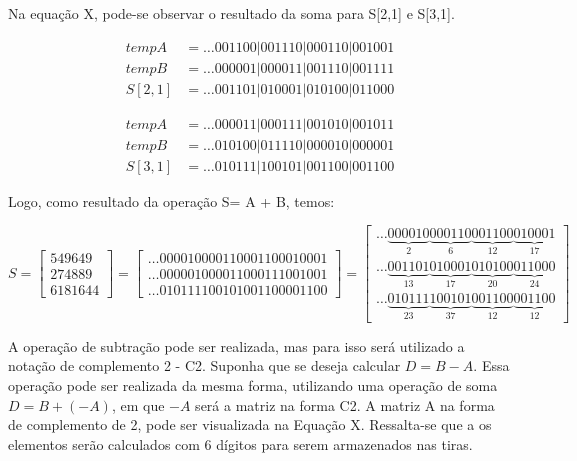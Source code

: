 \documentclass[12pt]{article}
\begin{document}
Na equação X, pode-se observar o resultado da soma para S[2,1] e S[3,1].

\begin{align*}
 tempA&= \ldots001100|001110|000110|001001\\
 tempB&= \ldots000001|000011|001110|001111\\
 S[2,1]&=\ldots001101|010001|010100|011000
\end{align*}

\begin{align*}
 tempA&= \ldots000011|000111|001010|001011 \\
 tempB&= \ldots010100|011110|000010|000001 \\
 S[3,1]&=\ldots010111|100101|001100|001100
\end{align*}

Logo, como resultado da operação S= A + B, temos:

\begin{equation}
	S = \begin{bmatrix}
			549649\\ 
			274889\\ 
			6181644
		\end{bmatrix}
        =
         \begin{bmatrix}
			\ldots000010000110001100010001\\
			\ldots000001000011000111001001\\
			\ldots010111100101001100001100
		\end{bmatrix}
        =
        \begin{bmatrix}

\ldots\underbrace{000010}_{2}\underbrace{000110}_{6}\underbrace{001100}_{12}
\underbrace{010001}_{17}\\	
 \ldots\underbrace{001101}_{13}\underbrace{010001}_{17}\underbrace{010100}_{20}
\underbrace{011000}_{24}\\
 \ldots\underbrace{010111}_{23}\underbrace{100101}_{37}\underbrace{001100}_{12}
\underbrace{001100}_{12}
		\end{bmatrix}
\end{equation}

A operação de subtração pode ser realizada, mas para isso será utilizado a
notação de complemento 2 - C2. Suponha que se deseja calcular $D = B - A$. Essa
operação pode ser realizada da mesma forma, utilizando uma operação de soma $D =
B + (-A)$, em que $-A$ será a matriz na forma C2. A matriz A na forma de
complemento de 2, pode ser visualizada na Equação X. Ressalta-se que a os
elementos serão calculados com 6 dígitos para serem armazenados nas tiras.
\end{document}
